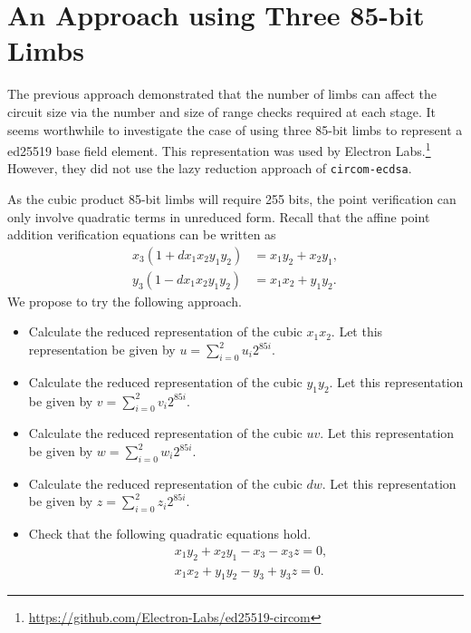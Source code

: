 \documentclass[a4paper, 12pt]{article}
\begin{document}
\section{An Approach using Three 85-bit Limbs}%
\label{sec:an_approach_using_three_85_bit_limbs}
The previous approach demonstrated that the number of limbs can affect the circuit size via the number and size of range checks required at each stage. It seems worthwhile to investigate the case of using three 85-bit limbs to represent a ed25519 base field element. This representation was used by Electron Labs.\footnote{\url{https://github.com/Electron-Labs/ed25519-circom}} However, they did not use the lazy reduction approach of \texttt{circom-ecdsa}.

As the cubic product 85-bit limbs will require 255 bits, the point verification can only involve quadratic terms in unreduced form.
Recall that the affine point addition verification equations can be written as
\begin{align}
  x_3(1+dx_1x_2y_1y_2) &= x_1y_2 + x_2y_1,\label{eqn8}\\
  y_3(1-dx_1x_2y_1y_2) &= x_1x_2 + y_1y_2.\label{eqn9}
\end{align}
We propose to try the following approach.
\begin{itemize}
  \item Calculate the reduced representation of the cubic $x_1x_2$. Let this representation be given by $u = \sum_{i=0}^{2}u_i 2^{85i}$.
  \item Calculate the reduced representation of the cubic $y_1y_2$. Let this representation be given by $v = \sum_{i=0}^{2}v_i 2^{85i}$.
  \item Calculate the reduced representation of the cubic $uv$. Let this representation be given by $w = \sum_{i=0}^{2}w_i 2^{85i}$.
  \item Calculate the reduced representation of the cubic $dw$. Let this representation be given by $z = \sum_{i=0}^{2}z_i 2^{85i}$.
  \item Check that the following quadratic equations hold.
    \begin{align*}
      & x_1y_2 + x_2y_1 -x_3 - x_3 z = 0,\\
      & x_1x_2 + y_1y_2 -y_3 + y_3 z = 0.
    \end{align*}
\end{itemize}
\end{document}
